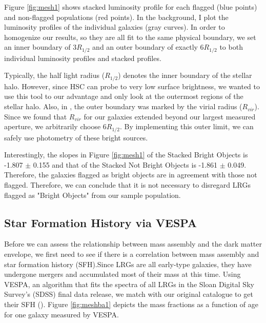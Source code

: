 \documentclass[apj]{emulateapj}
\begin{document}
Figure \ref{fig:mesh1} shows stacked luminosity profile for each flagged (blue points) and non-flagged populations (red points). In the background, I plot the luminosity profiles of the individual galaxies (gray curves).  In order to homogenize our results, so they are all fit to the same physical boundary, we set an inner boundary of $3R_{1/2}$ and an outer boundary of exactly $6R_{1/2}$ to both individual luminosity profiles and stacked profiles. 

Typically, the half light radius ($R_{1/2}$) denotes the inner boundary of the stellar halo. However, since HSC can probe to very low surface brightness, we wanted to use this tool to our advantage and only look at the outermost regions of the stellar halo. Also, in \cite{Pillepich:2014}, the outer boundary was marked by the virial radius ($R_{vir}$). Since we found that $R_{vir}$ for our galaxies extended beyond our largest measured aperture, we arbitrarily choose $6R_{1/2}$.  By implementing this outer limit, we can safely use photometry of these bright sources.

Interestingly, the slopes in Figure \ref{fig:mesh1} of the Stacked Bright Objects is -1.807  $\pm$  0.155 and that of the Stacked Not Bright Objects is -1.861  $\pm$  0.049. Therefore, the galaxies flagged as bright objects are in agreement with those not flagged. Therefore, we can conclude that it is not necessary to disregard LRGs flagged as "Bright Objects" from our sample population. 

\subsection{Star Formation History via VESPA}
Before we can assess the relationship between mass assembly and the dark matter envelope, we first need to see if there is a correlation between mass assembly and star formation history (SFH).Since LRGs are all early-type galaxies, they have undergone mergers and accumulated most of their mass at this time. Using VESPA, an algorithm that fits the spectra of all LRGs in the Sloan Digital Sky Survey's (SDSS) final data release, we match with our original catalogue to get their SFH (\cite{Tojeiro:2009}). Figure \ref{fig:meshba1} depicts the mass fractions as a function of age for one galaxy measured by VESPA.
\end{document}
